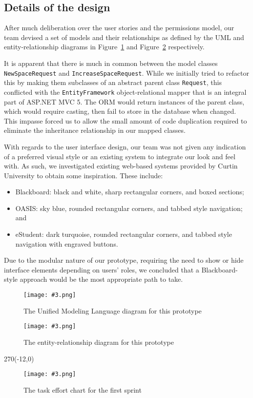 \documentclass[a4paper,titlepage,12pt]{article}
\newcommand\figimg[4][\textwidth]{
	\begin{figure}
		\caption{#4}
		\label{fig:#2}
		\texttt{[image: \#3.png]}
	\end{figure}
}
\begin{document}
\subsection{Details of the design}

After much deliberation over the user stories and the permissions model, our
team devised a set of models and their relationships as defined by the UML and
entity-relationship diagrams in Figure~\ref{fig:uml} and Figure~\ref{fig:erd}
respectively.

It is apparent that there is much in common between the model classes
\texttt{NewSpaceRequest} and \texttt{IncreaseSpaceRequest}. While
we initially tried to refactor this by making them subclasses of an abstract
parent class \texttt{Request}, this conflicted with the
\texttt{EntityFramework} object-relational mapper that is an integral part of
ASP.NET MVC 5. The ORM would return instances of the parent class, which would
require casting, then fail to store in the database when changed. This
impasse forced us to allow the small amount of code duplication required
to eliminate the inheritance relationship in our mapped classes.

With regards to the user interface design, our team was not given any
indication of a preferred visual style or an existing system to integrate our
look and feel with. As such, we investigated existing web-based systems
provided by Curtin University to obtain some inspiration. These include:

\begin{itemize}
	\item Blackboard: black and white, sharp rectangular corners, and boxed
	      sections;
	\item OASIS: sky blue, rounded rectangular corners, and tabbed style
	      navigation; and
	\item eStudent: dark turquoise, rounded rectangular corners, and tabbed
	      style navigation with engraved buttons.
\end{itemize}

Due to the modular nature of our prototype, requiring the need to show or hide
interface elements depending on users' roles, we concluded that a
Blackboard-style approach would be the most appropriate path to take.

\figimg{uml}{uml}{The Unified Modeling Language diagram for this prototype}

\figimg{erd}{erd}{The entity-relationship diagram for this prototype}

\begin{landscape}
	\quad %
	\thispagestyle{empty}
	\begin{textblock}{270}(-12,0)
		\figimg[270mm]{effort1}{effort1}
			{The task effort chart for the first sprint}
	\end{textblock}
\end{landscape}
\end{document}
